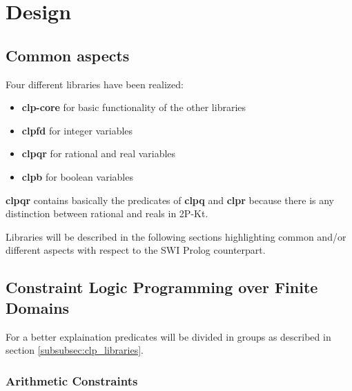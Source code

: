 \section{Design}\label{sec:design}

\subsection{Common aspects}\label{subsec:common_aspects}
Four different libraries have been realized:
\begin{itemize}
    \item \textbf{clp-core} for basic functionality of the other libraries
    \item \textbf{clpfd} for integer variables
    \item \textbf{clpqr} for rational and real variables
    \item \textbf{clpb} for boolean variables
\end{itemize}
\textbf{clpqr} contains basically the predicates of \textbf{clpq} and \textbf{clpr} because there
is any distinction between rational and reals in 2P-Kt.\newline

Libraries will be described in the following sections highlighting common and/or different aspects with respect to the SWI Prolog counterpart.

\subsection{Constraint Logic Programming over Finite Domains}\label{subsec:clpfd}
For a better explaination predicates will be divided in groups as described in section \ref{subsubsec:clp_libraries}.

\subsubsection{Arithmetic Constraints}\label{subsubsec:arithmetic_constraints}

